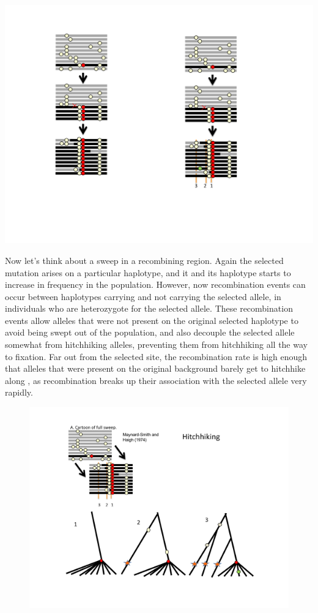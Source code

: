 \begin{marginfigure}
\begin{center}
\includegraphics[width= 0.5 \textwidth]{figures/Hitchhiking/recom_haps_sweep.pdf}
\end{center}
\caption{} \label{fig:sweep_haps}
\end{marginfigure}
Now let's think about a sweep in a recombining region. Again the
selected mutation arises on a particular haplotype, and it and its
haplotype starts to increase in frequency in the population. However,
now recombination events can occur between haplotypes carrying and not
carrying the selected allele, in individuals who are heterozygote for
the selected allele. These recombination events allow alleles that
were not present on the original selected haplotype to avoid being
swept out of the population, and also decouple the selected allele
somewhat from hitchhiking alleles, preventing  them from hitchhiking all
the way to fixation. Far out from the selected site, the recombination
rate is high enough that alleles that were present on the original
background barely get to hitchhike along , as recombination breaks up their association with the selected allele very rapidly.

\begin{figure}
\begin{center}
\includegraphics[width= 0.9 \textwidth]{figures/Hitchhiking/recom_haps_coal_sweep.pdf}
\end{center}
\caption{} \label{fig:sweep_haps_coal}
\end{figure}

